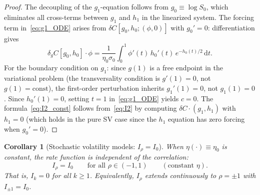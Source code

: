\documentclass[11pt]{article}
\newtheorem{corollary}[theorem]{Corollary}
\theoremstyle{definition}
\newcommand{\dd}{\mathrm{d}}
\begin{document}
\begin{proof}
The decoupling of the $g_1$-equation follows from $g_0 \equiv \log S_0$, which eliminates all cross-terms between $g_1$ and $h_1$ in the linearized system. The forcing term in~\eqref{eq:g1_ODE} arises from $\delta C[g_0, h_0; (\phi, 0)]$ with $g_0' = 0$: differentiation gives
\begin{equation}
  \delta_g C[g_0, h_0]\cdot\phi = \frac{1}{\eta_0\sigma_0}\int_0^1 \phi'(t)\,h_0'(t)\,e^{-h_0(t)/2}\,\dd t.
\end{equation}
For the boundary condition on $g_1$: since $g(1)$ is a free endpoint in the variational problem (the transversality condition is $g'(1) = 0$, not $g(1) = \text{const}$), the first-order perturbation inherits $g_1'(1) = 0$, not $g_1(1) = 0$. Since $h_0'(1) = 0$, setting $t = 1$ in~\eqref{eq:g1_ODE} yields $c = 0$. The formula~\eqref{eq:I2_const} follows from~\eqref{eq:I2} by computing $\delta C\cdot(g_1, h_1)$ with $h_1 = 0$ (which holds in the pure SV case since the $h_1$ equation has zero forcing when $g_0' = 0$).
\end{proof}

\begin{corollary}[Stochastic volatility models: $I_\rho = I_0$]\label{cor:SV}
When $\eta(\cdot) \equiv \eta_0$ is constant, the rate function is independent of the correlation:
\begin{equation}\label{eq:SV_expansion}
  I_\rho = I_0 \qquad \text{for all } \rho \in (-1,1) \qquad (\text{constant } \eta).
\end{equation}
That is, $I_k = 0$ for all $k \geq 1$. Equivalently, $I_\rho$ extends continuously to $\rho = \pm 1$ with $I_{\pm 1} = I_0$.
\end{corollary}
\end{document}

